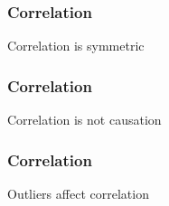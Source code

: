 \documentclass[handout]{beamer}
\begin{document}
   \begin{frame}
   \frametitle{Correlation}
   \begin{center}
   \end{center}
   Correlation is symmetric
   \end{frame}



   \begin{frame}
   \frametitle{Correlation}
   \begin{center}
   \end{center}
   Correlation is not causation
   \end{frame}



   \begin{frame}
   \frametitle{Correlation}
   \begin{center}
   \end{center}
   Outliers affect correlation
   \end{frame}
\end{document}
